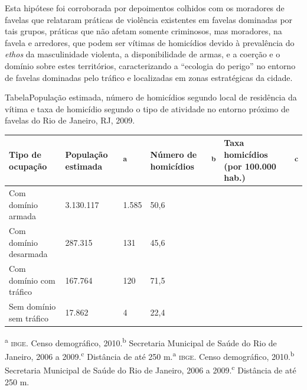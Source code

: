 \documentclass{article}
\begin{document}
Esta hipótese foi corroborada por depoimentos colhidos com os moradores de
favelas que relataram práticas de violência existentes em favelas dominadas por
tais grupos, práticas que não afetam somente criminosos, mas moradores, na
favela e arredores, que podem ser vítimas de homicídios devido à prevalência do
\textit{ethos}
da masculinidade violenta, a disponibilidade de armas, e a coerção e o domínio
sobre estes territórios, caracterizando a “ecologia do perigo” no entorno de
favelas dominadas pelo tráfico e localizadas em zonas estratégicas da cidade.

TabelaPopulação estimada, número de homicídios segundo local de residência da
vítima e taxa de homicídio segundo o tipo de atividade no entorno próximo de
favelas do Rio de Janeiro, RJ, 2009.
\begin{table}
\begin{xtabular}{ l | l | l | l | l | l | l }
\hline
Tipo de ocupação & População estimada &\textsuperscript{a}
& Número de homicídios &\textsuperscript{b}
& Taxa homicídios (por 100.000 hab.) &\textsuperscript{c}
\\ \hline
Com domínio armada
& 3.130.117
& 1.585
& 50,6
\\ \hline

Com domínio desarmada
& 287.315
& 131
& 45,6
\\ \hline

Com domínio com tráfico
& 167.764
& 120
& 71,5
\\ \hline

Sem domínio sem tráfico
& 17.862
& 4
& 22,4
\\ \hline

\end{xtabular}
\end{table}\textsuperscript{a}
\textsc{ibge}. Censo demográfico, 2010.\textsuperscript{b}
Secretaria Municipal de Saúde do Rio de Janeiro, 2006 a 2009.\textsuperscript{c}
Distância de até 250 m.\textsuperscript{a}
\textsc{ibge}. Censo demográfico, 2010.\textsuperscript{b}
Secretaria Municipal de Saúde do Rio de Janeiro, 2006 a 2009.\textsuperscript{c}
Distância de até 250 m.
\end{document}
